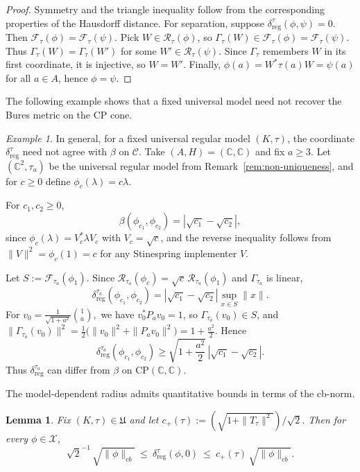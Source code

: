 \documentclass[11pt]{amsart}
\newtheorem{lemma}[theorem]{Lemma}
\theoremstyle{definition}
\theoremstyle{remark}
\newtheorem{example}[theorem]{Example}
\newcommand{\C}{\mathbb C}
\newcommand{\1}{\mathbbm{1}}
\newcommand{\CP}{\mathrm{CP}}
\begin{document}
\begin{proof}
Symmetry and the triangle inequality follow from the corresponding properties of the Hausdorff distance.
For separation, suppose $\delta_{\mathrm{reg}}^{\tau}(\phi,\psi)=0$. Then $\mathscr F_\tau(\phi)=\mathscr F_\tau(\psi)$.
Pick $W\in\mathscr R_\tau(\phi)$, so $\Gamma_\tau(W)\in\mathscr F_\tau(\phi)=\mathscr F_\tau(\psi)$.
Thus $\Gamma_\tau(W)=\Gamma_\tau(W')$ for some $W'\in\mathscr R_\tau(\psi)$.
Since $\Gamma_\tau$ remembers $W$ in its first coordinate, it is injective, so $W=W'$.
Finally, $\phi(a)=W^*\tau(a)W=\psi(a)$ for all $a\in A$, hence $\phi=\psi$.
\end{proof}
The following example shows that a fixed universal model need not recover the Bures metric on the CP cone.
\begin{example}%
\label{ex:fixed-model-mismatch}
In general, for a fixed universal regular model $(K,\tau)$, the coordinate $\delta_{\mathrm{reg}}^{\tau}$ need not agree with $\beta$ on $\mathcal C$.
Take $(A,H)=(\C,\C)$ and fix $a\ge3$. Let $(\C^2,\tau_a)$ be the universal regular model from
Remark~\ref{rem:non-uniqueness}, and for $c\ge0$ define $\phi_c(\lambda)=c\lambda$.

For $c_1,c_2\ge0$,
\begin{equation}\label{eq:1-dim}
\beta(\phi_{c_1},\phi_{c_2})=|\sqrt{c_1}-\sqrt{c_2}|,
\end{equation}
since $\phi_c(\lambda)=V_c^*\lambda V_c$ with $V_c=\sqrt c$, and the reverse inequality follows from
$\|V\|^2=\phi_c(1)=c$ for any Stinespring implementer $V$.

Let $S:=\mathscr F_{\tau_a}(\phi_1)$. Since $\mathscr R_{\tau_a}(\phi_c)=\sqrt c\,\mathscr R_{\tau_a}(\phi_1)$ and $\Gamma_{\tau_a}$ is linear,
\[
\delta_{\mathrm{reg}}^{\tau_a}(\phi_{c_1},\phi_{c_2})
=
|\sqrt{c_1}-\sqrt{c_2}|\sup_{x\in S}\|x\|.
\]
For $v_0=\frac{1}{\sqrt{1+a^2}}\binom{1}{a},$
we have $v_0^*P_a v_0=1$, so $\Gamma_{\tau_a}(v_0)\in S$, and $\|\Gamma_{\tau_a}(v_0)\|^2
=
\frac12\bigl(\|v_0\|^2+\|P_a v_0\|^2\bigr)
=
1+\frac{a^2}{2}.$
Hence
\[
\delta_{\mathrm{reg}}^{\tau_a}(\phi_{c_1},\phi_{c_2})
\ge
\sqrt{1+\frac{a^2}{2}}\,
|\sqrt{c_1}-\sqrt{c_2}|.
\]
Thus $\delta_{\mathrm{reg}}^{\tau_a}$ can differ from $\beta$ on $\CP(\C,\C)$.
\end{example}

The model-dependent radius admits quantitative bounds in terms of the cb-norm.
\begin{lemma}
\label{lem:rad-bounds}
Fix $(K,\tau)\in\mathfrak U$ and let 
$c_+(\tau):=(\sqrt{1+\|T_\tau\|^2})/\sqrt2.$
Then for every $\phi\in \mathcal X$,
\[
{\sqrt2}^{-1}\,\sqrt{\|\phi\|_{cb}}
\ \le\ \delta_{\mathrm{reg}}^{\tau}(\phi,0)
\ \le\ c_+(\tau)\,\sqrt{\|\phi\|_{cb}}.
\]
\end{lemma}
\end{document}
